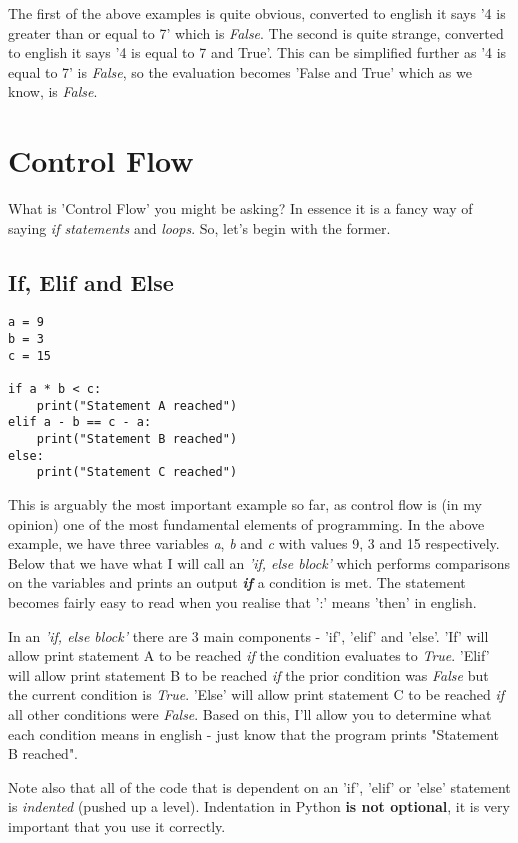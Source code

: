 \documentclass{article}
\begin{document}
The first of the above examples is quite obvious, converted to english it says '4 is greater than or equal to 7' which is \textit{False}. The second is quite strange, converted to english it says '4 is equal to 7 and True'. This can be simplified further as '4 is equal to 7' is \textit{False}, so the evaluation becomes 'False and True' which as we know, is \textit{False}. \medskip

\section{Control Flow}
What is 'Control Flow' you might be asking? In essence it is a fancy way of saying \textit{if statements} and \textit{loops}. So, let's begin with the former.

\subsection{If, Elif and Else}

\begin{verbatim}
a = 9
b = 3
c = 15

if a * b < c:
    print("Statement A reached")
elif a - b == c - a:
    print("Statement B reached")
else:
    print("Statement C reached")
\end{verbatim}

This is arguably the most important example so far, as control flow is (in my opinion) one of the most fundamental elements of programming. In the above example, we have three variables \textit{a}, \textit{b} and \textit{c} with values 9, 3 and 15 respectively. Below that we have what I will call an \textit{'if, else block'} which performs comparisons on the variables and prints an output \textit{\textbf{if}} a condition is met. The statement becomes fairly easy to read when you realise that ':' means 'then' in english. \medskip

In an \textit{'if, else block'} there are 3 main components - 'if', 'elif' and 'else'. 'If' will allow print statement A to be reached \textit{if} the condition evaluates to \textit{True}. 'Elif' will allow print statement B to be reached \textit{if} the prior condition was \textit{False} but the current condition is \textit{True}. 'Else' will allow print statement C to be reached \textit{if} all other conditions were \textit{False}. Based on this, I'll allow you to determine what each condition means in english - just know that the program prints "Statement B reached".\medskip

Note also that all of the code that is dependent on an 'if', 'elif' or 'else' statement is \textit{indented} (pushed up a level). Indentation in Python \textbf{is not optional}, it is very important that you use it correctly.
\end{document}
